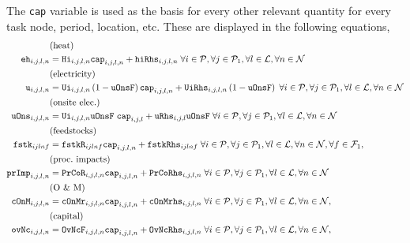 \documentclass{amsbook}
\begin{document}
The \texttt{cap} variable is used as the basis for every other relevant quantity
for every task node, period, location, etc. These are displayed in the following
equations,
%
\begin{align}\label{eq:eqset1}
    & \text{(heat)}  \notag \\
    \mathtt{eh}_{i,j,l,n} &= \mathtt{Hi}_{i,j,l,n} \mathtt{cap}_{i,j,l,n} 
    + \mathtt{hiRhs}_{i,j,l,n}  \;
    \forall i \in \mathcal{P},
    \forall j \in \mathcal{P}_1,
    \forall l \in \mathcal{L},
    \forall n \in \mathcal{N} \\
    & \text{(electricity)}  \notag \\
    \mathtt{u}_{i,j,l,n}  &= 
    \mathtt{Ui}_{i,j,l,n}\left(1-\mathtt{uOnsF}\right)\mathtt{cap}_{i,j,l,n} 
    + \mathtt{UiRhs}_{i,j,l,n} \left(1 - \mathtt{uOnsF}\right) \;
    \forall i \in \mathcal{P},
    \forall j \in \mathcal{P}_1,
    \forall l \in \mathcal{L},
    \forall n \in \mathcal{N} \\
    & \text{(onsite elec.)} \notag \\
    \mathtt{uOns}_{i,j,l,n} &= 
    \mathtt{Ui}_{i,j,l,n}  \mathtt{uOnsF} \; 
    \mathtt{cap}_{i,j,l} + \mathtt{uRhs}_{i,j,l} \mathtt{uOnsF} \;
    \forall i \in \mathcal{P},
    \forall j \in \mathcal{P}_1,
    \forall l \in \mathcal{L},
    \forall n \in \mathcal{N} \\
    & \text{(feedstocks)} \notag \\
    \mathtt{fstk}_{ijlnf} &= 
    \mathtt{fstkR}_{ijlnf}  
    \mathtt{cap}_{i,j,l,n} + \mathtt{fstkRhs}_{ijlnf}  \;
    \forall i \in \mathcal{P},
    \forall j \in \mathcal{P}_1,
    \forall l \in \mathcal{L},
    \forall n \in \mathcal{N},
    \forall f \in \mathcal{F}_1, \\
    & \text{(proc.\ impacts)} \notag \\
    \mathtt{prImp}_{i,j,l,n} &= \mathtt{PrCoR}_{i,j,l,n} \mathtt{cap}_{i,j,l,n} 
    + \mathtt{PrCoRhs}_{i,j,l,n} \;
    \forall i \in \mathcal{P},
    \forall j \in \mathcal{P}_1,
    \forall l \in \mathcal{L},
    \forall n \in \mathcal{N} \\
    & \text{(O \& M)} \notag \\
    \mathtt{cOnM}_{i,j,l,n} &= 
    \mathtt{cOnMr}_{i,j,l,n} \mathtt{cap}_{i,j,l,n} +
    \mathtt{cOnMrhs}_{i,j,l,n} \;
    \forall i \in \mathcal{P},
    \forall j \in \mathcal{P}_1,
    \forall l \in \mathcal{L},
    \forall n \in \mathcal{N}, \\
    & \text{(capital)} \notag \\
    \mathtt{ovNc}_{i,j,l,n} &= \mathtt{OvNcF}_{i,j,l,n} \mathtt{cap}_{i,j,l,n}
    + \mathtt{OvNcRhs}_{i,j,l,n} \;
    \forall i \in \mathcal{P},
    \forall j \in \mathcal{P}_1,
    \forall l \in \mathcal{L},
    \forall n \in \mathcal{N}, 
\end{align}
\end{document}
